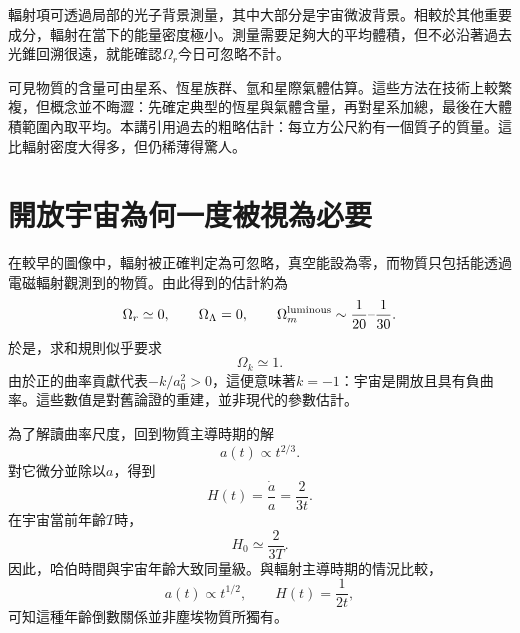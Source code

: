 \begin{classroomqa}
\end{classroomqa}

輻射項可透過局部的光子背景測量，其中大部分是宇宙微波背景。相較於其他重要成分，輻射在當下的能量密度極小。測量需要足夠大的平均體積，但不必沿著過去光錐回溯很遠，就能確認\(\Omega_r\)今日可忽略不計。

可見物質的含量可由星系、恆星族群、氫和星際氣體估算。這些方法在技術上較繁複，但概念並不晦澀：先確定典型的恆星與氣體含量，再對星系加總，最後在大體積範圍內取平均。本講引用過去的粗略估計：每立方公尺約有一個質子的質量。這比輻射密度大得多，但仍稀薄得驚人。

\begin{classroomqa}
\end{classroomqa}

\section{開放宇宙為何一度被視為必要}

在較早的圖像中，輻射被正確判定為可忽略，真空能設為零，而物質只包括能透過電磁輻射觀測到的物質。由此得到的估計約為
\begin{equation}
\Omega_r\simeq0,
\qquad
\Omega_\Lambda=0,
\qquad
\Omega_m^{\rm luminous}\sim\frac{1}{20}\text{--}\frac{1}{30}.
\end{equation}
於是，求和規則似乎要求
\begin{equation}
\Omega_k\simeq1.
\end{equation}
由於正的曲率貢獻代表\(-k/a_0^2>0\)，這便意味著\(k=-1\)：宇宙是開放且具有負曲率。這些數值是對舊論證的重建，並非現代的參數估計。

為了解讀曲率尺度，回到物質主導時期的解
\begin{equation}
a(t)\propto t^{2/3}.
\end{equation}
對它微分並除以\(a\)，得到
\begin{equation}
H(t)=\frac{\dot a}{a}=\frac{2}{3t}.
\label{eq:c06-matter-h}
\end{equation}
在宇宙當前年齡\(T\)時，
\begin{equation}
H_0\simeq\frac{2}{3T}.
\end{equation}
因此，哈伯時間與宇宙年齡大致同量級。與輻射主導時期的情況比較，
\begin{equation}
a(t)\propto t^{1/2},
\qquad
H(t)=\frac{1}{2t},
\end{equation}
可知這種年齡倒數關係並非塵埃物質所獨有。


